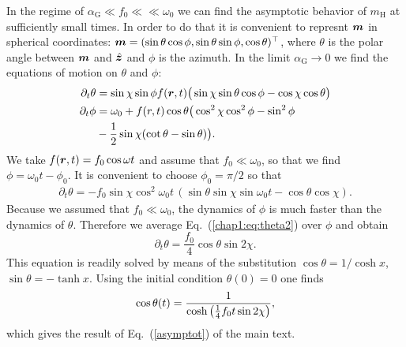 In the regime of $\alpha_\textrm{G}\ll f_0 \ll \ll \omega_0$ we can find the asymptotic behavior of $m_\textrm{H}$ at sufficiently small times. In order to do that it is convenient to represnt $\boldsymbol{m}$ in spherical coordinates: $\boldsymbol{m}=(\sin\theta\cos\phi,\sin\theta\sin\phi,\cos\theta)^\top$, where $\theta$ is the polar angle between $\boldsymbol{m}$ and $\hat{\boldsymbol{z}}$ and $\phi$ is the azimuth. In the limit $\alpha_\textrm{G}\rightarrow 0$ we find the equations of motion on $\theta$ and $\phi$:
\begin{align}
\partial_t \theta &= \sin \chi  \sin \phi  f(\boldsymbol{r},t) \big(\sin \chi  \sin \theta \cos \phi -\cos \chi  \cos \theta \big)\\
\partial_t \phi &=\omega_0+f(r,t) 
  \cos\theta\big(\cos ^2\chi  \cos ^2\phi-\sin^2\phi \nonumber\\
  &-\frac{1}{2}\sin\chi(\cot\theta-\sin\theta) \big).
\end{align}
We take $f(\boldsymbol{r},t)=f_0\cos\omega t$ and assume that $f_0\ll\omega_0$, so that we find $\phi = \omega_0 t-\phi_0$. It is convenient to choose $\phi_0=\pi/2$ so that
\begin{align}
  \partial_t \theta = -f_0 \sin \chi  \cos ^2\omega_0t\,(\sin \theta  \sin \chi  \sin \omega_0t-\cos \theta  \cos \chi ).
  \label{chap1:eq:theta2}
\end{align}
Because we assumed that $f_0\ll\omega_0$, the dynamics of $\phi$ is much faster than the dynamics of $\theta$. Therefore we average Eq.~(\ref{chap1:eq:theta2}) over $\phi$ and obtain
\begin{equation}
  \partial_t\theta = \frac{f_0}{4} \cos \theta \sin2\chi.
\end{equation}
This equation is readily solved by means of the substitution $\cos\theta = 1/\cosh x$, $\sin\theta=-\tanh x$. Using the initial condition $\theta(0)=0$ one finds 
\begin{equation}
\cos\theta(t) = \frac{1}{\cosh\left( \frac{1}{4}f_0 t \sin2\chi\right)},
\end{equation}
which gives the result of Eq.~(\ref{asymptot}) of the main text.

